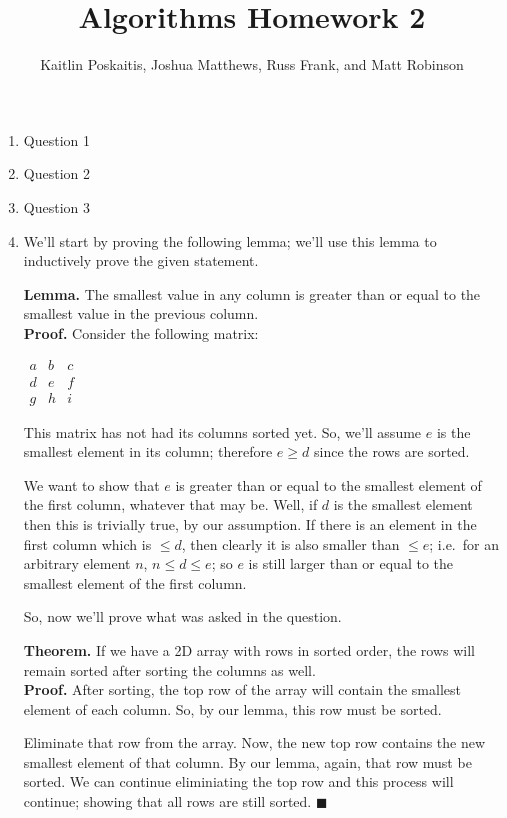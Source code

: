 \documentclass[12pt]{article}
\title{\bf Algorithms Homework 2}
\author{Kaitlin Poskaitis, Joshua Matthews, Russ Frank, and Matt Robinson}
\date{}
\begin{document}
\maketitle

\begin{enumerate}

\item Question 1

\item Question 2

\item Question 3

\item 

  We'll start by proving the following lemma; we'll use this lemma to
  inductively prove the given statement.

  \textbf{Lemma.} The smallest value in any column is greater than or equal to
  the smallest value in the previous column.\\
  \textbf{Proof.} Consider the following matrix:

  $\begin{matrix}
    a & b & c \\
    d & e & f \\
    g & h & i
  \end{matrix}$

  This matrix has not had its columns sorted yet. So, we'll assume $e$ is the
  smallest element in its column; therefore $e \ge d$ since the rows are sorted.

  We want to show that $e$ is greater than or equal to the smallest element of the first
  column, whatever that may be. Well, if $d$ is the smallest element then this
  is trivially true, by our assumption. If there is an element in the first
  column which is $\le d$, then clearly it is also smaller than $\le e$;
  i.e.\ for an arbitrary element $n$, $n \le d \le e$; so $e$ is still larger 
  than or equal to the smallest element of the first column.

  So, now we'll prove what was asked in the question.

  \textbf{Theorem.} If we have a 2D array with rows in sorted order, the rows
  will remain sorted after sorting the columns as well. \\
  \textbf{Proof.} After sorting, the top row of the array will contain the
  smallest element of each column. So, by our lemma, this row must be sorted.

  Eliminate that row from the array. Now, the new top row contains the new
  smallest element of that column. By our lemma, again, that row must be
  sorted. We can continue eliminiating the top row and this process will
  continue; showing that all rows are still sorted. $\blacksquare$

\end{enumerate}
\end{document}
